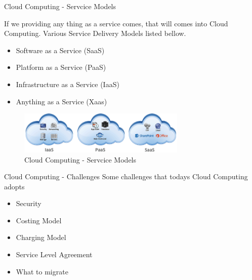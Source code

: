 \documentclass[xcolor=dvipsnames]{beamer}
\begin{document}
\begin{frame}{Cloud Computing - Servcice Models }

If we providing any thing as a service comes, that will comes into Cloud Computing. Various Service Delivery Models listed bellow.

\begin{itemize}
\item Software as a Service (SaaS) 
\item Platform as a Service (PaaS)
\item Infrastructure as a Service (IaaS)
\item Anything as a Service (Xaas)
\end{itemize}
\begin{figure}[H]
 \centering
 \includegraphics[width=8cm]{./service.png}
 \caption{Cloud Computing - Servcice Models \label{fig:service} }
\end{figure}

\end{frame}

\begin{frame}{Cloud Computing - Challenges \cite{ref_1}}
Some challenges that todays Cloud Computing adopts

\begin{itemize}
\item Security
\item Costing Model
\item Charging Model
\item Service Level Agreement
\item What to migrate
\end{itemize}
\end{frame}
\end{document}
